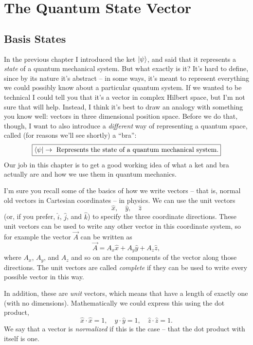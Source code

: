 \chapter{The Quantum State Vector}

\section{Basis States}

In the previous chapter I introduced the ket $| \psi \rangle$, and said that it represents a \emph{state} of a quantum mechanical system.  But what exactly is it?  It's hard to define, since by its nature it's abstract -- in some ways, it's meant to represent everything we could possibly know about a particular quantum system.  If we wanted to be technical I could tell you that it's a vector in complex Hilbert space, but I'm not sure that will help. Instead, I think it's best to draw an analogy with something you know well:  vectors in three dimensional position space.  Before we do that, though, I want to also introduce a \emph{different} way of representing a quantum space, called (for reasons we'll see shortly) a ``bra'':
\begin{equation}
\label{eq_bra_definition}
\boxed{
\langle \psi | \rightarrow \text{ Represents the state of a quantum mechanical system.}
}
\end{equation}
Our job in this chapter is to get a good working idea of what a ket and bra actually are and how we use them in quantum mechanics.

I'm sure you recall some of the basics of how we write vectors -- that is, normal old vectors in Cartesian coordinates -- in physics.  We can use the unit vectors
\[
\hat{x}, \quad \hat{y}, \quad \hat{z}
\]
(or, if you prefer, $\hat{i}$, $\hat{j}$, and $\hat{k}$) to specify the three coordinate directions.  These unit vectors can be used to write any other vector in this coordinate system, so for example the vector $\vec{A}$ can be written as
\[
\vec{A} = A_x \hat{x} + A_y \hat{y} + A_z \hat{z},
\]
where $A_x$, $A_y$, and $A_z$ and so on are the components of the vector along those directions.  The unit vectors are called \emph{complete} if they can be used to write every possible vector in this way.

In addition, these are \emph{unit} vectors, which means that have a length of exactly one (with no dimensions).  Mathematically we could express this using the dot product,
\[
\hat{x} \cdot \hat{x} = 1, \quad \hat{y} \cdot \hat{y} = 1, \quad \hat{z} \cdot \hat{z} = 1.
\]
We say that a vector is \emph{normalized} if this is the case -- that the dot product with itself is one.

